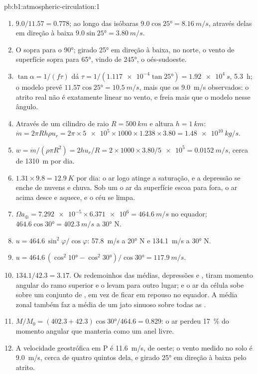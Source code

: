 \begin{solution}{pb:b1:atmospheric-circulation:1}
\begin{enumerate}
        estabelecer, e a fórmula não se aplica.
  \item $9.0/11.57 = 0.778$; ao longo das isóbaras $9.0\cos\ang{25} = \qty{8.16}{m/s}$, através delas
        em direção à baixa $9.0\sin\ang{25} = \qty{3.80}{m/s}$.
  \item O  sopra para o  \ang{90}; girado \ang{25} em direção à baixa, no norte,
        o vento de superfície sopra para \ang{65}, vindo de \ang{245}, o oés-sudoeste.
  \item $\tan\alpha = 1/(f\tau)$ dá $\tau = 1/(\num{1.117e-4}\tan\ang{25}) =
        \qty{1.92e4}{s}$, \qty{5.3}{h}; o modelo prevê $11.57\cos\ang{25} =
        \qty{10.5}{m/s}$, mais que os \qty{9.0}{m/s} observados: o atrito real não é exatamente linear no
        vento, e freia mais que o modelo nesse ângulo.
  \item Através de um cilindro de raio $R = \qty{500}{km}$ e altura $h =
        \qty{1}{km}$: $\dot m = 2\pi R h\rho u_r = 2\pi \times \num{5e5} \times 1000
        \times 1.238 \times 3.80 = \qty{1.48e10}{kg/s}$.
  \item $w = \dot m/(\rho\pi R^2) = 2hu_r/R = 2 \times 1000 \times 3.80/\num{5e5} =
        \qty{0.0152}{m/s}$, cerca de \qty{1310}{m} por dia.
  \item $1.31 \times 9.8 = \qty{12.9}{K}$ por dia: o ar logo atinge a saturação, e a depressão se enche
        de nuvens e chuva. Sob um  o ar da superfície escoa para fora, o ar acima desce e
        aquece, e o céu se limpa.
  \item $\Omega a_\oplus = \num{7.292e-5} \times \num{6.371e6} = \qty{464.6}{m/s}$ no equador;
        $464.6\cos\ang{30} = \qty{402.3}{m/s}$ a \ang{30} N.
  \item $u = 464.6\,\sin^2\varphi/\cos\varphi$: \qty{57.8}{m/s} a \ang{20} N e \qty{134.1}{m/s} a
        \ang{30} N.
  \item $u = 464.6\,(\cos^2\ang{10} - \cos^2\ang{30})/\cos\ang{30} =
        \qty{117.9}{m/s}$.
  \item $134.1/42.3 = 3.17$. Os redemoinhos das  médias, depressões e , tiram
        momento angular do ramo superior e o levam para outro lugar; e o ar da célula sobe sobre um
        conjunto de , em vez de ficar em repouso no equador. A média zonal também faz a média de
        um jato sinuoso sobre todas as .
  \item $M/M_0 = (402.3 + 42.3)\cos\ang{30}/464.6 = 0.829$: o ar perdeu \qty{17}{\percent} do momento
        angular que manteria como um anel livre.
  \item A velocidade geostrófica em P é \qty{11.6}{m/s}, de oeste; o vento medido no solo é
        \qty{9.0}{m/s}, cerca de quatro quintos dela, e girado \ang{25} em direção à baixa pelo atrito.
\end{enumerate}
\end{solution}
